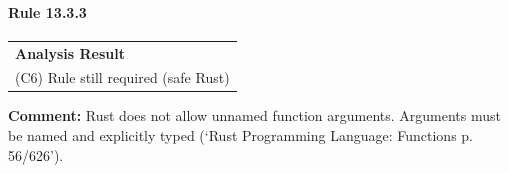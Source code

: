 \paragraph{Rule 13.3.3}
\begin{longtable}{p{13cm}}
\textbf{Analysis Result} \\
(C6) Rule still required (safe Rust) \\
\end{longtable}
\textbf{Comment:} Rust does not allow unnamed function arguments. Arguments must be named and explicitly typed (`Rust Programming Language: Functions p. 56/626'). \\


